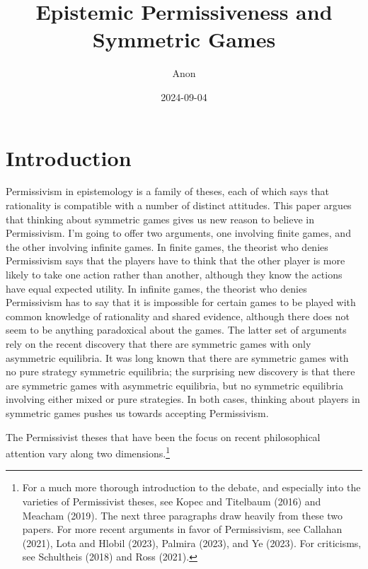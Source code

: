 \documentclass[
  11pt,
]{article}
\title{Epistemic Permissiveness and Symmetric Games}
\author{Anon}
\date{2024-09-04}
\begin{document}
\maketitle

\section{Introduction}\label{introduction}

Permissivism in epistemology is a family of theses, each of which says that rationality is compatible with a number of distinct attitudes. This paper argues that thinking about symmetric games gives us new reason to believe in Permissivism. I'm going to offer two arguments, one involving finite games, and the other involving infinite games. In finite games, the theorist who denies Permissivism says that the players have to think that the other player is more likely to take one action rather than another, although they know the actions have equal expected utility. In infinite games, the theorist who denies Permissivism has to say that it is impossible for certain games to be played with common knowledge of rationality and shared evidence, although there does not seem to be anything paradoxical about the games. The latter set of arguments rely on the recent discovery that there are symmetric games with only asymmetric equilibria. It was long known that there are symmetric games with no pure strategy symmetric equilibria; the surprising new discovery is that there are symmetric games with asymmetric equilibria, but no symmetric equilibria involving either mixed or pure strategies. In both cases, thinking about players in symmetric games pushes us towards accepting Permissivism.

The Permissivist theses that have been the focus on recent philosophical attention vary along two dimensions.\footnote{For a much more thorough introduction to the debate, and especially into the varieties of Permissivist theses, see Kopec and Titelbaum (2016) and Meacham (2019). The next three paragraphs draw heavily from these two papers. For more recent arguments in favor of Permissivism, see Callahan (2021), Lota and Hlobil (2023), Palmira (2023), and Ye (2023). For criticisms, see Schultheis (2018) and Ross (2021).}
\end{document}
